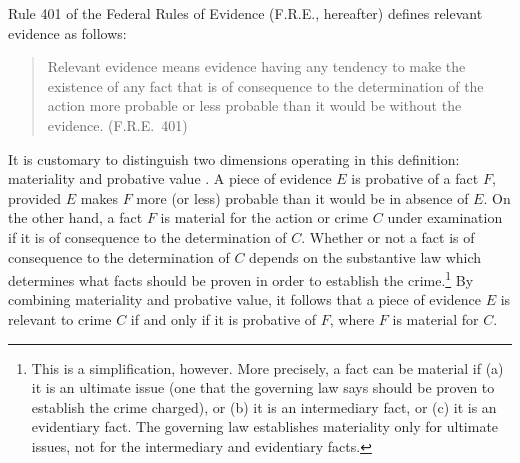 \documentclass[10pt]{article}
\begin{document}
Rule 401 of the Federal Rules of Evidence (F.R.E., hereafter) 
defines relevant evidence as follows:
%
\begin{quote}
\begin{singlespace}
Relevant evidence means evidence having any tendency to make the existence of any fact that is of consequence to the determination of the action more probable or less probable than it would be without the evidence. (F.R.E.\ 401)
\end{singlespace}
\end{quote}
%
It is customary to distinguish two dimensions operating in this definition: materiality and probative value \citep{Fisher2008Evidence, Mendez2008}. A piece of evidence $E$ is probative of a fact $F$, provided $E$ makes $F$ more (or less) probable than it would be in absence of $E$. On the other hand, 
a fact $F$ is material for the action or crime $C$ under examination if it is of consequence to the determination of $C$. Whether or not a fact is of consequence to the determination of $C$ depends on the substantive law which determines what facts should be proven in order to establish the crime.\footnote{This is a simplification, however. More precisely, a fact can be material if (a) it is an ultimate issue (one that the governing law says should be proven to establish the crime charged), or (b) it is an intermediary fact, or (c) it is an evidentiary fact. The governing law establishes materiality only for ultimate issues, not for the intermediary and evidentiary facts.} By combining materiality and probative value, it follows that a piece of evidence $E$ is relevant to  crime $C$ if and only if it is probative of $F$, where $F$ is material for $C$.
\end{document}
